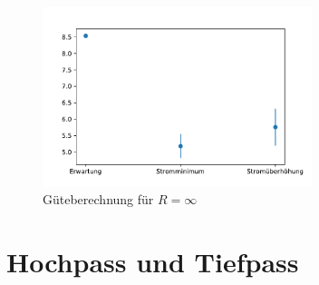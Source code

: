 \documentclass[12pt,a4paper]{article}
\begin{document}
\begin{figure}[H]
\centering
\includegraphics[width=0.7\textwidth]{Python/Pinf_Fazit.pdf}
\caption{Güteberechnung für $R=\infty$}
\label{Pinf_Fazit}
\end{figure}

\section{Hochpass und Tiefpass}
\end{document}
